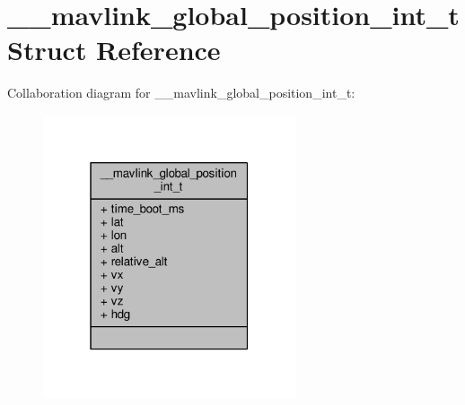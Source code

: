 \hypertarget{struct____mavlink__global__position__int__t}{\section{\+\_\+\+\_\+mavlink\+\_\+global\+\_\+position\+\_\+int\+\_\+t Struct Reference}
\label{struct____mavlink__global__position__int__t}
}


Collaboration diagram for \+\_\+\+\_\+mavlink\+\_\+global\+\_\+position\+\_\+int\+\_\+t\+:
\nopagebreak
\begin{figure}[H]
\begin{center}
\leavevmode
\includegraphics[width=211pt]{struct____mavlink__global__position__int__t__coll__graph}
\end{center}
\end{figure}
